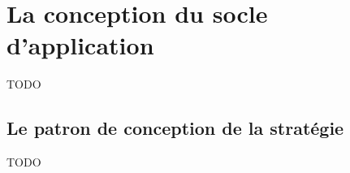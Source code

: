 \section{La conception du socle d'application}
\label{sec:framework-imp}
TODO

\subsection{Le patron de conception de la stratégie}
\label{subsec:strategy-pattern}
TODO